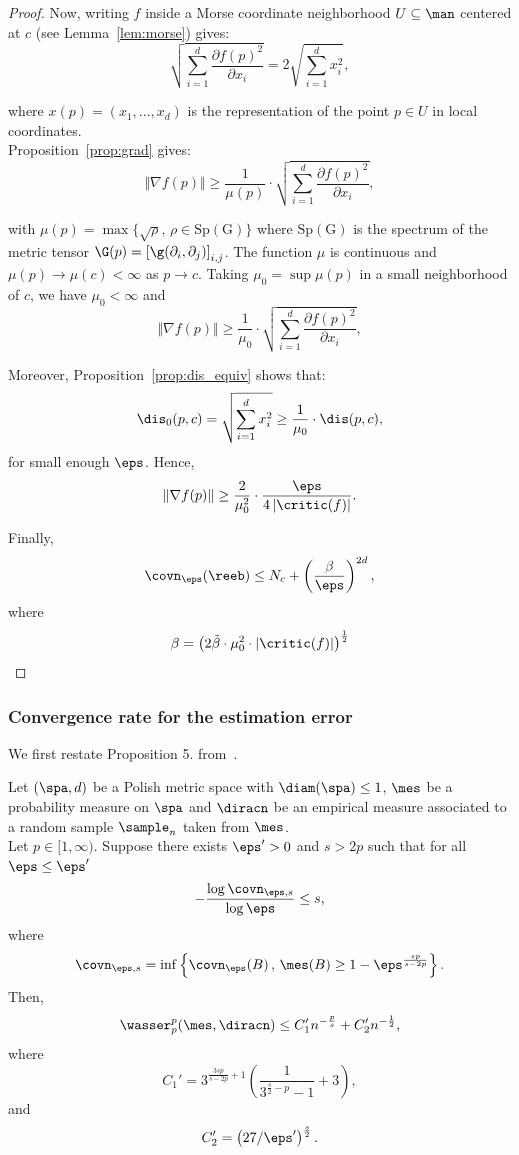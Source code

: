 \begin{proof}
 Now, writing $f$ inside a Morse coordinate neighborhood $U\subseteq\man$ centered at $c$ (see Lemma~\ref{lem:morse}) gives:\\
 $$\sqrt{\sum_{i=1}^d\frac{\partial f(p)^2}{\partial x_i}}=2\sqrt{\sum_{i=1}^d x_i^2},$$
 
 where $x(p)=(x_1,...,x_d)$ is the representation of the point $p\in U$ in local coordinates.\\
Proposition~\ref{prop:grad} gives:
$$\Vert \nabla f(p) \Vert\geq \frac{1}{\mu(p)}\cdot \sqrt{\sum_{i=1}^d\frac{\partial f(p)^2}{\partial x_i}},$$

with $\mu(p)=\max\{\sqrt{\rho},\, \rho\in\mathrm{Sp(G)}\}$ where $\mathrm{Sp(G)}$ is the spectrum of the metric tensor $\G(p)=\left[\g(\partial_i,\partial_j)\right]_{i,j}$. The function $\mu$ is continuous and $\mu(p)\rightarrow\mu(c)<\infty$ as $p\rightarrow c$. Taking $\mu_0=\sup \mu(p)$ in a small neighborhood of $c$, we have $\mu_0<\infty$ and 
$$\Vert \nabla f(p) \Vert\geq \frac{1}{\mu_0}\cdot \sqrt{\sum_{i=1}^d\frac{\partial f(p)^2}{\partial x_i}},$$
 
Moreover, Proposition~\ref{prop:dis_equiv} shows that:
$$\dis_0(p,c)=\sqrt{\sum_{i=1}^d x_i^2}\geq \frac{1}{\mu_0} \cdot \dis(p,c),$$
for small enough $\eps$. Hence,
$$\Vert \nabla f(p) \Vert \geq \frac{2}{\mu_0^2}\cdot \frac{\eps}{4\left|\critic(f)\right|}.$$



Finally,
$$\covn_\eps(\reeb)\leq N_c+\left(\frac{\beta}{\eps}\right)^{2d},$$
where 
$$\beta=\left(2\Tilde{\beta}\cdot \mu_0^2\cdot\left|\critic(f)\right| \right)^{\frac{1}{2}}$$

 \end{proof}
 
\subsubsection{Convergence rate for the estimation error} 
We first restate Proposition 5. from~\cite{weed2019sharp}.
\begin{proposition}\label{prop:weed}
Let $(\spa,d)$ be a Polish metric space with $\diam(\spa)\leq 1$, $\mes$ be a probability measure on $\spa$ and $\diracn$ be an empirical measure associated to a random sample $\sample_n$ taken from $\mes$. \\
Let $p\in[1,\infty)$. Suppose there exists $\eps'>0$ and $s>2p$ such that for all $\eps\leq\eps'$
$$-\frac{\log \covn_{\eps,s}}{\log\eps}\leq s,$$
 where $$\covn_{\eps,s}=\inf\left\{\covn_\eps(B)\, ,\,\mes(B)\geq 1-\eps^{\frac{sp}{s-2p}}\right\}.$$
 Then,
 $$\wasser_p^p(\mes,\diracn)\leq C_1'n^{-\frac{p}{s}}+C_2'n^{-\frac{1}{2}},$$
 where 
 $$C_1'=3^{\frac{3sp}{s-2p}+1}\left(\frac{1}{3^{\frac{s}{2}-p}-1}+3\right),$$
 and
 $$C_2'=\left(27/\eps'\right)^{\frac{s}{2}}.$$

\end{proposition}

